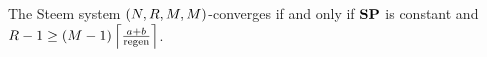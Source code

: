 \begin{theorem}
  The Steem system $\left(\playerlen, \rounds, \postlen,
  \postlen\right)$-converges if and only if $\stpowvec$ is constant and $\rounds
  - 1 \geq \left(\postlen - 1\right) \ceil*{\frac{a + b}{\regen}}$.
\end{theorem}
